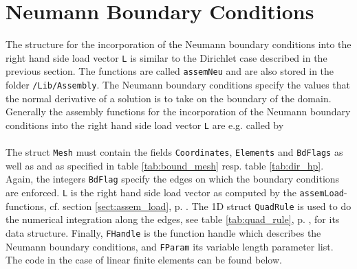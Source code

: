 
\section{Neumann Boundary Conditions} \label{sect:assem_neu} 

The structure for the incorporation of the Neumann boundary conditions into the right hand side load vector {\tt L} is similar to the Dirichlet case described in the previous section. The functions are called {\tt assemNeu} and are also stored in the folder {\tt /Lib/Assembly}. The Neumann boundary conditions specify the values that the normal derivative of a solution is to take on the boundary of the domain. \\

 Generally the assembly functions for the incorporation of the Neumann boundary conditions into the right hand side load vector {\tt L} are e.g. called by \\

 \\

 The struct {\tt Mesh} must contain the fields {\tt Coordinates}, {\tt Elements} and {\tt BdFlags} as well as  and  as specified in table \ref{tab:bound_mesh} resp. table \ref{tab:dir_hp}. Again, the integers {\tt BdFlag} specify the edges on which the boundary conditions are enforced. {\tt L} is the right hand side load vector as computed by the {\tt assemLoad}-functions, cf. section \ref{sect:assem_load}, p. \pageref{sect:assem_load}. The 1D struct {\tt QuadRule} is used to do the numerical integration along the edges, see table \ref{tab:quad_rule}, p. \pageref{tab:quad_rule}, for its data structure. Finally, {\tt FHandle} is the function handle which describes the Neumann boundary conditions, and {\tt FParam} its variable length parameter list. \\
 
 
The code in the case of linear finite elements can be found below.

